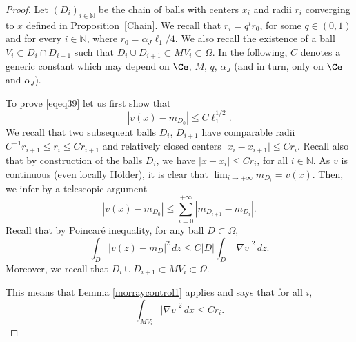 \documentclass[12pt]{article}
\theoremstyle{definition}
\theoremstyle{remark}
\numberwithin{equation}{section}
\newcommand{\abs}[1]{\lvert #1 \rvert}
\newcommand{\N}{\mathbb{N}}
\begin{document}
\begin{proof} Let $(D_i)_{i\in\N}$ be the chain of balls with centers $x_i$ and radii $r_i$ converging to $x$ defined in Proposition~\ref{Chain}.
    We recall that $r_i=q^i r_0$, for some $q\in(0,1)$ and for every $i\in\N$, where $r_0=\alpha_J \ell_1/4$. We also recall the existence of a ball $V_i\subset D_i\cap D_{i+1}$ such that $D_i\cup D_{i+1}\subset M V_i\subset \Omega$.
       In the following, $C$ denotes a generic constant which may depend on $\Ce$, $M$, $q$, $\alpha_J$ (and in turn, only on $\Ce$ and $\alpha_J$).

    To prove  \eqref{eqeq39} let us first show that
    \begin{equation}
        |v(x)-m_{D_0}|\leq C\ell_1^{1/2}. \label{step1toprove}
    \end{equation}
    We recall that two subsequent balls $D_i$, $D_{i+1}$ have comparable radii $C^{-1} r_{i+1} \leq r_i \leq C r_{i+1}$ and relatively closed centers $\abs{x_i - x_{i+1}} \leq C r_i$.
    Recall also that by construction of the balls $D_i$, we have $\abs{x - x_i} \leq C r_i$, for all $i\in\N$.
    As $v$ is continuous (even locally Hölder), it is clear that $\displaystyle{\lim_{i \to + \infty}} m_{D_i} = v(x)$.
    Then, we infer by a telescopic argument
    \begin{equation}
        \label{eqeq88}
        |v(x)-m_{D_0}| \leq \sum_{i=0}^{+\infty} |m_{D_{i+1}} - m_{D_i}|.
    \end{equation}
    Recall that by Poincar\'e  inequality, for any ball $D\subset \Omega$,
    \begin{equation}
        \int_{D} \abs{v(z) - m_{D} }^2 \, dz \leq C |D| \int_{D} \abs{\nabla v}^2 \, dz.
    \end{equation}
    Moreover, we recall that $D_i \cup D_{i+1} \subset MV_i \subset \Omega$.
   
   
       This means that Lemma \ref{morraycontrol1} applies and says that for all $i$,
    \[\int_{M V_i}|\nabla v|^2\, dx\leq C r_i.\]


\end{proof}
\end{document}

